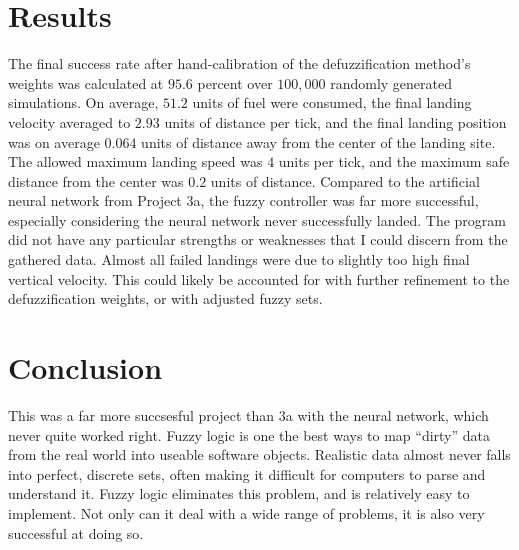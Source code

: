 \documentclass[12pt, article]{scrartcl}
\begin{document}
\section{Results}
The final success rate after hand-calibration of the defuzzification method's weights was calculated at $95.6$ percent over $100,000$ randomly generated simulations. On average, $51.2$ units of fuel were consumed, the final landing velocity averaged to $2.93$ units of distance per tick, and the final landing position was on average $0.064$ units of distance away from the center of the landing site. The allowed maximum landing speed was $4$ units per tick, and the maximum safe distance from the center was $0.2$ units of distance. Compared to the artificial neural network from Project 3a, the fuzzy controller was far more successful, especially considering the neural network never successfully landed. The program did not have any particular strengths or weaknesses that I could discern from the gathered data. Almost all failed landings were due to slightly too high final vertical velocity. This could likely be accounted for with further refinement to the defuzzification weights, or with adjusted fuzzy sets.

\section{Conclusion}
This was a far more succsesful project than 3a with the neural network, which never quite worked right. Fuzzy logic is one the best ways to map ``dirty'' data from the real world into useable software objects. Realistic data almost never falls into perfect, discrete sets, often making it difficult for computers to parse and understand it. Fuzzy logic eliminates this problem, and is relatively easy to implement. Not only can it deal with a wide range of problems, it is also very successful at doing so.
\end{document}
